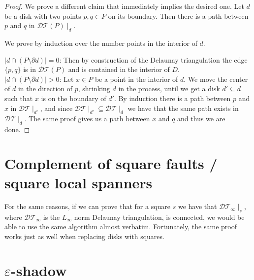 \documentclass{article}
\newcommand{\eps}{\varepsilon}
\newcommand{\DT}{\mathcal{DT}}
\begin{document}
	\begin{proof}
		We prove a different claim that immediately implies the desired one. Let $d$ be a disk with two points $p,q\in P$ on its boundary. Then there is a path between $p$ and $q$ in $\DT(P)\mid_d$.
		
		We prove by induction over the number points in the interior of $d$.
		
		$|d\cap (P\setminus \partial d)| = 0$: Then by construction of the Delaunay triangulation the edge $\{p,q\}$ is in $\DT(P)$ and is contained in the interior of $D$.\\
		
		$|d\cap (P\setminus \partial d)| > 0$: Let $x\in P$ be a point in the interior of $d$. We move the center of $d$ in the direction of $p$, shrinking $d$ in the process, until we get a disk $d'\subseteq d$ such that $x$ is on the boundary of $d'$. By induction there is a path between $p$ and $x$ in $\DT\mid_{d'}$, and since $\DT\mid_{d'}\subseteq \DT\mid_{d}$ we have that the same path exists in $\DT\mid_{d}$. The same proof gives us a path between $x$ and $q$ and thus we are done.
		
	\end{proof}

	\section{Complement of square faults / square local spanners}
	
	For the same reasons, if we can prove that for a square $s$ we have that $\DT_\infty\mid_s$, where $\DT_\infty$ is the $L_{\infty}$ norm Delaunay triangulation, is connected, we would be able to use the same algorithm almost verbatim. Fortunately, the same proof works just as well when replacing disks with squares.
	
	\section{$\eps$-shadow}
	
	
	
	
\end{document}
